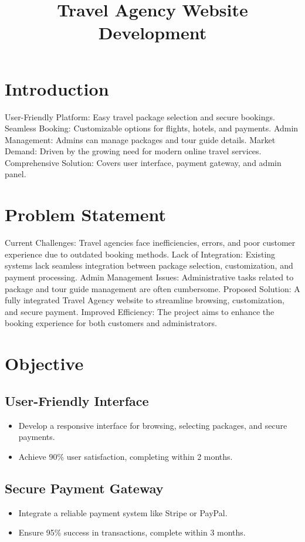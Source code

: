 \documentclass[12pt]{scrreprt}
\title{Travel Agency Website Development}
\author{}
\date{}
\begin{document}
\maketitle

\section{Introduction}
User-Friendly Platform: Easy travel package selection and secure bookings.  
Seamless Booking: Customizable options for flights, hotels, and payments.  
Admin Management: Admins can manage packages and tour guide details.  
Market Demand: Driven by the growing need for modern online travel services.  
Comprehensive Solution: Covers user interface, payment gateway, and admin panel.

\section{Problem Statement}
Current Challenges: Travel agencies face inefficiencies, errors, and poor customer experience due to outdated booking methods.  
Lack of Integration: Existing systems lack seamless integration between package selection, customization, and payment processing.  
Admin Management Issues: Administrative tasks related to package and tour guide management are often cumbersome.  
Proposed Solution: A fully integrated Travel Agency website to streamline browsing, customization, and secure payment.  
Improved Efficiency: The project aims to enhance the booking experience for both customers and administrators.

\section{Objective}
\subsection{User-Friendly Interface}
\begin{itemize}
    \item Develop a responsive interface for browsing, selecting packages, and secure payments.
    \item Achieve 90\% user satisfaction, completing within 2 months.
\end{itemize}

\subsection{Secure Payment Gateway}
\begin{itemize}
    \item Integrate a reliable payment system like Stripe or PayPal.
    \item Ensure 95\% success in transactions, complete within 3 months.
\end{itemize}
\end{document}
